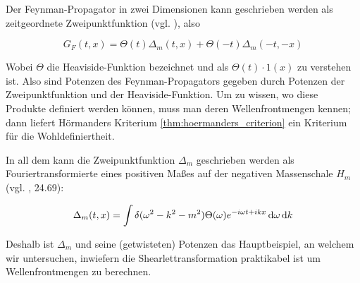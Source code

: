 Der Feynman-Propagator in zwei Dimensionen kann geschrieben werden als zeitgeordnete Zweipunktfunktion (vgl. \textcite{ReedSimon}), also

\begin{equation}
    G_F(t,x)
    =
    \Theta (t)\Delta_m(t,x) + \Theta(-t)\Delta_m(-t,-x)
    \label{eq:feynman_propgator_as_product}
\end{equation}

Wobei $\Theta$ die Heaviside-Funktion bezeichnet und als $\Theta(t) \cdot 1(x)$ zu verstehen ist. Also sind Potenzen des Feynman-Propagators gegeben durch Potenzen der Zweipunktfunktion und der Heaviside-Funktion. Um zu wissen, wo diese Produkte definiert werden können, muss man deren Wellenfrontmengen kennen; dann liefert Hörmanders Kriterium \ref{thm:hoermanders_criterion} ein Kriterium für die Wohldefiniertheit.

In all dem kann die Zweipunktfunktion $\Delta_m$ geschrieben werden als Fouriertransformierte eines positiven Maßes auf der negativen Massenschale $H_m$ (vgl. \textcite{Schwartz2014}, 24.69):

\begin{equation}
    \Delta_m (t,x) = \int \delta (\omega^2-k^2-m^2)
                    \Theta(\omega)e^{-i\omega t + i k x} \mathop{}\!\mathrm{d} \omega \mathop{}\!\mathrm{d} k
\label{eq:delta_m}
\end{equation}

Deshalb ist $\Delta_m$ und seine (getwisteten) Potenzen das Hauptbeispiel, an welchem wir untersuchen, inwiefern die Shearlettransformation praktikabel ist um Wellenfrontmengen zu berechnen.

